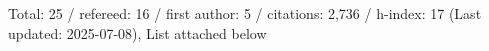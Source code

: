 Total: 25 / refereed: 16 / first author: 5 / citations: 2,736 / h-index: 17 (Last updated: 2025-07-08), List attached below
